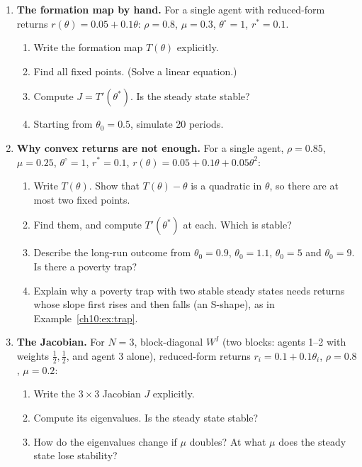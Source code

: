 \documentclass[../structural_economics_book.tex]{subfiles}
\begin{document}
\begin{enumerate}[label=\textbf{10.\arabic*}, leftmargin=3em]

\item \textbf{The formation map by hand.} For a single agent with reduced-form returns $r(\theta) = 0.05 + 0.1\theta$: $\rho = 0.8$, $\mu = 0.3$, $\theta^{\circ} = 1$, $r^* = 0.1$.
\begin{enumerate}
\item Write the formation map $T(\theta)$ explicitly.
\item Find all fixed points. (Solve a linear equation.)
\item Compute $J = T'(\theta^*)$. Is the steady state stable?
\item Starting from $\theta_0 = 0.5$, simulate 20 periods.
\end{enumerate}

\item \textbf{Why convex returns are not enough.} For a single agent, $\rho = 0.85$, $\mu = 0.25$, $\theta^{\circ} = 1$, $r^* = 0.1$, $r(\theta) = 0.05 + 0.1\theta + 0.05\theta^2$:
\begin{enumerate}
\item Write $T(\theta)$. Show that $T(\theta) - \theta$ is a quadratic in $\theta$, so there are at most two fixed points.
\item Find them, and compute $T'(\theta^*)$ at each. Which is stable?
\item Describe the long-run outcome from $\theta_0 = 0.9$, $\theta_0 = 1.1$, $\theta_0 = 5$ and $\theta_0 = 9$. Is there a poverty trap?
\item Explain why a poverty trap with two stable steady states needs returns whose slope first rises and then falls (an S-shape), as in Example~\ref{ch10:ex:trap}.
\end{enumerate}

\item \textbf{The Jacobian.} For $N = 3$, block-diagonal $W^I$ (two blocks: agents 1--2 with weights $\frac12, \frac12$, and agent 3 alone), reduced-form returns $r_i = 0.1 + 0.1\theta_i$, $\rho = 0.8$, $\mu = 0.2$:
\begin{enumerate}
\item Write the $3 \times 3$ Jacobian $J$ explicitly.
\item Compute its eigenvalues. Is the steady state stable?
\item How do the eigenvalues change if $\mu$ doubles? At what $\mu$ does the steady state lose stability?
\end{enumerate}


\end{enumerate}
\end{document}
